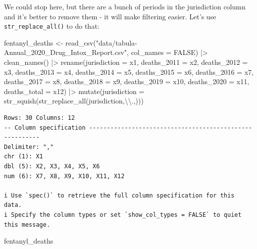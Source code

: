 \documentclass[
  letterpaper,
  DIV=11,
  numbers=noendperiod]{scrreprt}
\newenvironment{Shaded}{\begin{snugshade}}{\end{snugshade}}
\newcommand{\AttributeTok}[1]{\textcolor[rgb]{0.40,0.45,0.13}{#1}}
\newcommand{\ConstantTok}[1]{\textcolor[rgb]{0.56,0.35,0.01}{#1}}
\newcommand{\FunctionTok}[1]{\textcolor[rgb]{0.28,0.35,0.67}{#1}}
\newcommand{\NormalTok}[1]{\textcolor[rgb]{0.00,0.23,0.31}{#1}}
\newcommand{\OtherTok}[1]{\textcolor[rgb]{0.00,0.23,0.31}{#1}}
\newcommand{\SpecialCharTok}[1]{\textcolor[rgb]{0.37,0.37,0.37}{#1}}
\newcommand{\StringTok}[1]{\textcolor[rgb]{0.13,0.47,0.30}{#1}}
\begin{document}
We could stop here, but there are a bunch of periods in the jurisdiction
column and it's better to remove them - it will make filtering easier.
Let's use \texttt{str\_replace\_all()} to do that:

\begin{Shaded}
\begin{Highlighting}[]
\NormalTok{fentanyl\_deaths }\OtherTok{\textless{}{-}} \FunctionTok{read\_csv}\NormalTok{(}\StringTok{"data/tabula{-}Annual\_2020\_Drug\_Intox\_Report.csv"}\NormalTok{, }\AttributeTok{col\_names =} \ConstantTok{FALSE}\NormalTok{) }\SpecialCharTok{|\textgreater{}} 
  \FunctionTok{clean\_names}\NormalTok{() }\SpecialCharTok{|\textgreater{}} 
  \FunctionTok{rename}\NormalTok{(}\AttributeTok{jurisdiction =}\NormalTok{ x1, }\AttributeTok{deaths\_2011 =}\NormalTok{ x2, }\AttributeTok{deaths\_2012 =}\NormalTok{ x3, }\AttributeTok{deaths\_2013 =}\NormalTok{ x4, }\AttributeTok{deaths\_2014 =}\NormalTok{ x5, }\AttributeTok{deaths\_2015 =}\NormalTok{ x6, }\AttributeTok{deaths\_2016 =}\NormalTok{ x7, }\AttributeTok{deaths\_2017 =}\NormalTok{ x8, }
         \AttributeTok{deaths\_2018 =}\NormalTok{ x9, }\AttributeTok{deaths\_2019 =}\NormalTok{ x10, }\AttributeTok{deaths\_2020 =}\NormalTok{ x11, }\AttributeTok{deaths\_total =}\NormalTok{ x12) }\SpecialCharTok{|\textgreater{}} 
  \FunctionTok{mutate}\NormalTok{(}\AttributeTok{jurisdiction =} \FunctionTok{str\_squish}\NormalTok{(}\FunctionTok{str\_replace\_all}\NormalTok{(jurisdiction,}\StringTok{\textquotesingle{}}\SpecialCharTok{\textbackslash{}\textbackslash{}}\StringTok{.\textquotesingle{}}\NormalTok{,}\StringTok{\textquotesingle{}\textquotesingle{}}\NormalTok{)))}
\end{Highlighting}
\end{Shaded}

\begin{verbatim}
Rows: 30 Columns: 12
-- Column specification --------------------------------------------------------
Delimiter: ","
chr (1): X1
dbl (5): X2, X3, X4, X5, X6
num (6): X7, X8, X9, X10, X11, X12

i Use `spec()` to retrieve the full column specification for this data.
i Specify the column types or set `show_col_types = FALSE` to quiet this message.
\end{verbatim}

\begin{Shaded}
\begin{Highlighting}[]
\NormalTok{fentanyl\_deaths}
\end{Highlighting}
\end{Shaded}
\end{document}
